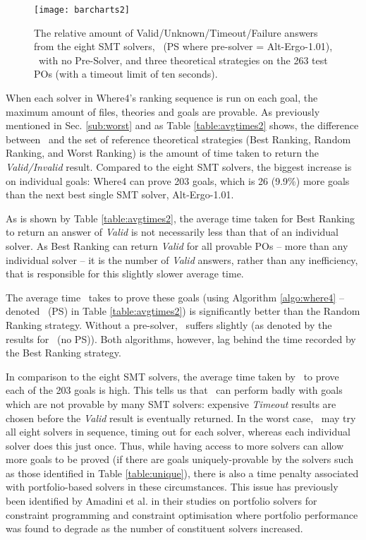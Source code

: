 \begin{figure}
	\centering
	\texttt{[image: barcharts2]}
	\caption[The relative amount of Valid/Unknown/Timeout/Failure answers from the eight SMT solvers and the top-ranking solver from the three theoretical strategies and \where~(w/(o) presolving).]{The relative amount of Valid/Unknown/Timeout/Failure answers from the eight SMT solvers, \where~(PS where pre-solver = Alt-Ergo-1.01), \where~with no Pre-Solver, and three theoretical strategies on the 263 test POs (with a timeout limit of ten seconds).}
	\label{fig:barchart2}
\end{figure}


When each solver in \textsf{Where4}'s ranking sequence is run on each goal, the maximum amount of files, theories and goals are provable. 
As previously mentioned in Sec. \ref{sub:worst} and as Table \ref{table:avgtimes2} shows, the difference between \where~and the set of reference theoretical strategies (\textsf{Best Ranking}, \textsf{Random Ranking}, and \textsf{Worst Ranking}) is the amount of time taken to return the \textit{Valid/Invalid} result. 
Compared to the eight SMT solvers, the biggest increase is on individual goals: \textsf{Where4} can prove 203 goals, which is 26 (9.9\%) more goals than the next best single SMT solver, Alt-Ergo-1.01.

As is shown by Table \ref{table:avgtimes2}, the average time taken for \textsf{Best Ranking} to return an answer of \textit{Valid} is not necessarily less than that of an individual solver. 
As \textsf{Best Ranking} can return \textit{Valid} for all provable POs -- more than any individual solver --
it is the number of \textit{Valid} answers, rather than any inefficiency, that is responsible for this slightly slower average time.  

The average time \where~takes to prove these goals 
(using Algorithm \ref{algo:where4} -- denoted \where~(PS) in Table \ref{table:avgtimes2}) 
is significantly better than the \textsf{Random Ranking} strategy.
Without a pre-solver, \where~suffers slightly (as denoted by the results for \where~(no PS)). 
Both algorithms, however, lag behind the time recorded by the \textsf{Best Ranking} strategy. 

In comparison to the eight SMT solvers, the average time taken by \where~to prove each of the 203 goals is high. 
This tells us that \where~can perform badly with goals which are not provable by many SMT solvers: expensive \textit{Timeout} results are chosen before the \textit{Valid} result is eventually returned. 
In the worst case, \where~may try all eight solvers in sequence, timing out for each solver, whereas each individual solver does this just once. 
Thus, while having access to more solvers can allow more goals to be proved (if there are goals uniquely-provable by the solvers such as those identified in Table \ref{table:unique}), there is also a time penalty associated with portfolio-based solvers in these circumstances.
This issue has previously been identified by Amadini et al. in their studies on portfolio solvers for constraint programming \cite{Amadini2013} and constraint optimisation \cite{Amadini2016} where portfolio performance was found to degrade as the number of constituent solvers increased.

